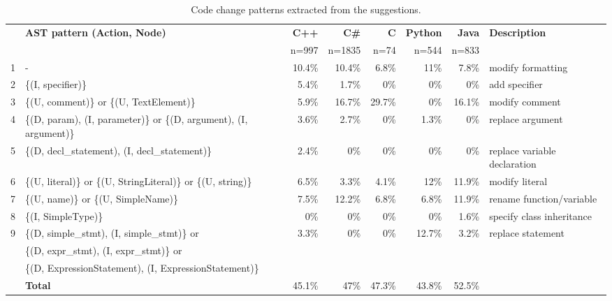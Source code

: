 \begin{table*}
  \caption{Code change patterns extracted from the  suggestions.}
  \label{tab:code_patterns}
  \begin{tabular}{llrrrrrl}
    \toprule
&\textbf{AST pattern (Action, Node) }&\textbf{C++}&\textbf{C\#}&\textbf{C}&\textbf{Python}&\textbf{Java}&\textbf{Description}\\
&&n=997&n=1835&n=74&n=544&n=833&\\
\toprule
1&-&10.4\%\cellcolor{red!25}&10.4\%&6.8\%&11\%&7.8\%&modify formatting\\
2&\{(I, specifier)\}&5.4\%&1.7\%&0\%&0\%&0\%&add specifier\\
3&\{(U, comment)\} or \{(U, TextElement)\}&5.9\%&\cellcolor{red!25}16.7\%&\cellcolor{red!25}29.7\%&0\%&\cellcolor{red!25}16.1\%&modify comment\\
4&\{(D, param), (I, parameter)\} or \{(D, argument), (I, argument)\}&3.6\%&2.7\%&0\%&1.3\%&0\%&replace argument\\
5&\{(D, decl\_statement), (I, decl\_statement)\}&2.4\%&0\%&0\%&0\%&0\%&replace variable declaration\\
6&\{(U, literal)\} or \{(U, StringLiteral)\} or \{(U, string)\}&6.5\%&3.3\%&4.1\%&12\%&11.9\%&modify literal\\
7&\{(U, name)\} or \{(U, SimpleName)\}&7.5\%&12.2\%&6.8\%&6.8\%&11.9\%&rename function/variable\\

8&\{(I, SimpleType)\}&0\%&0\%&0\%&0\%&1.6\%&specify class inheritance\\
9&\{(D, simple\_stmt), (I, simple\_stmt)\} or &3.3\%&0\%&0\%&\cellcolor{red!25}12.7\%&3.2\%&replace statement\\
&\{(D, expr\_stmt), (I, expr\_stmt)\} or&&&&&\\
&\{(D, ExpressionStatement), (I, ExpressionStatement)\}&&&&&&\\
\midrule
&\textbf{Total}&45.1\%&47\%&47.3\%&43.8\%&52.5\%&\\
\bottomrule
\end{tabular}
\end{table*}